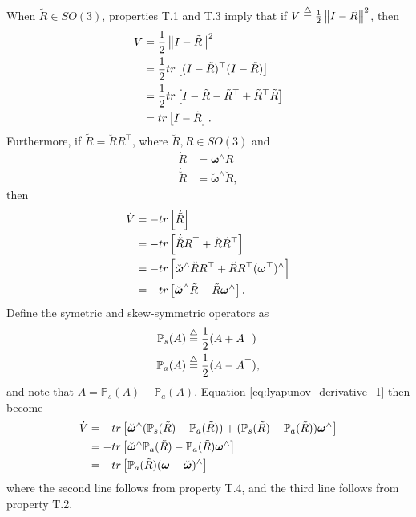 When $\tilde{R}\in SO(3)$, properties T.1 and T.3 imply that if $V\stackrel{\triangle}{=} \frac{1}{2}\left\|I-\tilde{R}\right\|^2$, then
\begin{align*}
V   &= \frac{1}{2} \left\|I-\tilde{R}\right\|^2 \\
	&= \frac{1}{2} tr\left[(I-\tilde{R})^\top(I-\tilde{R})\right] \\
  	&= \frac{1}{2} tr\left[ I - \tilde{R} - \tilde{R}^\top + \tilde{R}^\top\tilde{R}\right] \\
  	&= tr\left[I-\tilde{R}\right].
\end{align*}
Furthermore, if $\tilde{R}=\breve{R} R^\top$, where $\breve{R}, R\in SO(3)$ and 
\begin{align*}
\dot{R} &= \boldsymbol{\omega}^\wedge R \\	
\dot{\breve{R}} &=  \breve{\boldsymbol{\omega}}^\wedge \breve{R},
\end{align*}
then
\begin{align}
\dot{V} &= -tr\left[ \dot{\tilde{R}} \right] \notag \\
        &= -tr\left[ \dot{\breve{R}} R^\top + \breve{R} \dot{R}^\top \right] \notag\\
        &= -tr\left[ \breve{\boldsymbol{\omega}}^\wedge \breve{R} R^\top + \breve{R} R^\top (\boldsymbol{\omega}^\top)^\wedge \right] \notag\\
        &= -tr\left[ \breve{\boldsymbol{\omega}}^\wedge \tilde{R} - \tilde{R} \boldsymbol{\omega}^\wedge \right]. \label{eq:lyapunov_derivative_1}
\end{align}
Define the symetric and skew-symmetric operators as
\begin{align*}
\mathbb{P}_s (A) &\stackrel{\triangle}{=} \frac{1}{2}(A+A^\top) \\
\mathbb{P}_a (A) &\stackrel{\triangle}{=} \frac{1}{2}(A-A^\top),
\end{align*}
and note that $A=\mathbb{P}_s(A)+\mathbb{P}_a(A)$.  Equation \eqref{eq:lyapunov_derivative_1} then become
\begin{align}
\dot{V} &= -tr\left[ \breve{\boldsymbol{\omega}}^\wedge (\mathbb{P}_s(\tilde{R})-\mathbb{P}_a(\tilde{R})) + (\mathbb{P}_s(\tilde{R})+\mathbb{P}_a(\tilde{R})) \boldsymbol{\omega}^\wedge \right] \notag\\
&= -tr\left[ \breve{\boldsymbol{\omega}}^\wedge \mathbb{P}_a(\tilde{R}) - \mathbb{P}_a(\tilde{R}) \boldsymbol{\omega}^\wedge \right] \notag\\
&= -tr\left[  \mathbb{P}_a(\tilde{R})(\boldsymbol{\omega}-\breve{\boldsymbol{\omega}})^\wedge \right] \label{eq:lyapunov_derivative_2}
\end{align}
where the second line follows from property T.4, and the third line follows from property T.2.




